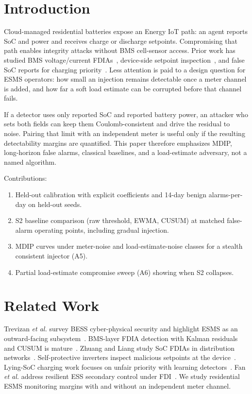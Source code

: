\documentclass[conference]{IEEEtran}
\begin{document}
\section{Introduction}
Cloud-managed residential batteries expose an Energy IoT path: an agent reports SoC and power and receives charge or discharge setpoints. Compromising that path enables integrity attacks without BMS cell-sensor access. Prior work has studied BMS voltage/current FDIAs~\cite{trevizan2022,zhuang2021,obrien2023,obrien2024}, device-side setpoint inspection~\cite{hossen2022}, and false SoC reports for charging priority~\cite{elshazly2024}. Less attention is paid to a design question for ESMS operators: how small an injection remains detectable once a meter channel is added, and how far a soft load estimate can be corrupted before that channel fails.

If a detector uses only reported SoC and reported battery power, an attacker who sets both fields can keep them Coulomb-consistent and drive the residual to noise. Pairing that limit with an independent meter is useful only if the resulting detectability margins are quantified. This paper therefore emphasizes MDIP, long-horizon false alarms, classical baselines, and a load-estimate adversary, not a named algorithm.

Contributions:
\begin{enumerate}
\item Held-out calibration with explicit coefficients and 14-day benign alarms-per-day on held-out seeds.
\item S2 baseline comparison (raw threshold, EWMA, CUSUM) at matched false-alarm operating points, including gradual injection.
\item MDIP curves under meter-noise and load-estimate-noise classes for a stealth consistent injector (A5).
\item Partial load-estimate compromise sweep (A6) showing when S2 collapses.
\end{enumerate}

\section{Related Work}
Trevizan \textit{et al.} survey BESS cyber-physical security and highlight ESMS as an outward-facing subsystem~\cite{trevizan2022}. BMS-layer FDIA detection with Kalman residuals and CUSUM is mature~\cite{obrien2023,obrien2024}. Zhuang and Liang study SoC FDIAs in distribution networks~\cite{zhuang2021}. Self-protective inverters inspect malicious setpoints at the device~\cite{hossen2022}. Lying-SoC charging work focuses on unfair priority with learning detectors~\cite{elshazly2024}. Fan \textit{et al.} address resilient ESS secondary control under FDI~\cite{fan2024}. We study residential ESMS monitoring margins with and without an independent meter channel.
\end{document}
